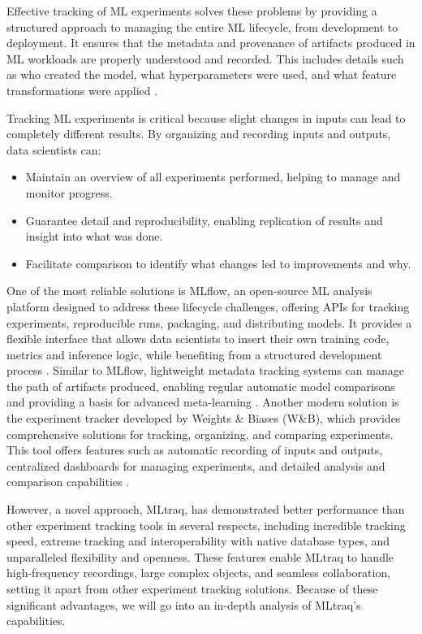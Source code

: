 Effective tracking of ML experiments solves these problems by providing a structured approach to managing the entire ML lifecycle, from development to deployment. It ensures that the metadata and provenance of artifacts produced in ML workloads are properly understood and recorded. This includes details such as who created the model, what hyperparameters were used, and what feature transformations were applied \cite{schelter2017automatically}.

Tracking ML experiments is critical because slight changes in inputs can lead to completely different results. By organizing and recording inputs and outputs, data scientists can:

\begin{itemize}
    \item Maintain an overview of all experiments performed, helping to manage and monitor progress.
    \item Guarantee detail and reproducibility, enabling replication of results and insight into what was done.
    \item Facilitate comparison to identify what changes led to improvements and why.
\end{itemize}

One of the most reliable solutions is MLflow, an open-source ML analysis platform designed to address these lifecycle challenges, offering APIs for tracking experiments, reproducible runs, packaging, and distributing models. It provides a flexible interface that allows data scientists to insert their own training code, metrics and inference logic, while benefiting from a structured development process \cite{zaharia2018accelerating}. Similar to MLflow, lightweight metadata tracking systems can manage the path of artifacts produced, enabling regular automatic model comparisons and providing a basis for advanced meta-learning \cite{schelter2017automatically}. Another modern solution is the experiment tracker developed by Weights \& Biases (W\&B), which provides comprehensive solutions for tracking, organizing, and comparing experiments. This tool offers features such as automatic recording of inputs and outputs, centralized dashboards for managing experiments, and detailed analysis and comparison capabilities \cite{wandb2023}.

However, a novel approach, MLtraq, has demonstrated better performance than other experiment tracking tools in several respects, including incredible tracking speed, extreme tracking and interoperability with native database types, and unparalleled flexibility and openness. These features enable MLtraq to handle high-frequency recordings, large complex objects, and seamless collaboration, setting it apart from other experiment tracking solutions. Because of these significant advantages, we will go into an in-depth analysis of MLtraq's capabilities.

